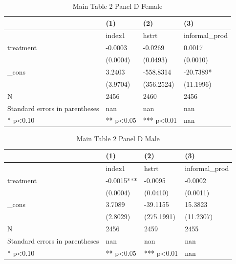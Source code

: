 \documentclass[11pt]{article}
\begin{document}
\clearpage
\begin{table}[!htbp]
\centering
\caption{Main Table 2 Panel D Female}
\label{tab:table2d_f}
\begin{tabular}{llll}
\toprule
 & (1) & (2) & (3) \\
\midrule
 & index1 & hstrt & informal\_prod \\
treatment & -0.0003 & -0.0269 & 0.0017 \\
 & (0.0004) & (0.0493) & (0.0010) \\
\_cons & 3.2403 & -558.8314 & -20.7389* \\
 & (3.9704) & (356.2524) & (11.1996) \\
N & 2456 & 2460 & 2456 \\
Standard errors in parentheses & nan & nan & nan \\
* p<0.10 & ** p<0.05 & *** p<0.01 & nan \\
\bottomrule
\end{tabular}

\end{table}

\clearpage
\begin{table}[!htbp]
\centering
\caption{Main Table 2 Panel D Male}
\label{tab:table2d_m}
\begin{tabular}{llll}
\toprule
 & (1) & (2) & (3) \\
\midrule
 & index1 & hstrt & informal\_prod \\
treatment & -0.0015*** & -0.0095 & -0.0002 \\
 & (0.0004) & (0.0410) & (0.0011) \\
\_cons & 3.7089 & -39.1155 & 15.3823 \\
 & (2.8029) & (275.1991) & (11.2307) \\
N & 2456 & 2459 & 2455 \\
Standard errors in parentheses & nan & nan & nan \\
* p<0.10 & ** p<0.05 & *** p<0.01 & nan \\
\bottomrule
\end{tabular}

\end{table}
\end{document}
